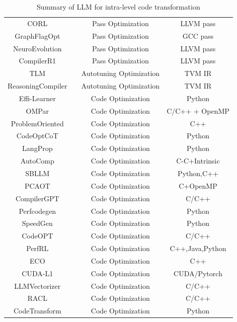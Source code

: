 \documentclass[pdflatex,sn-mathphys-ay,twocolumn, a4paper]{sn-jnl}%
\theoremstyle{thmstyleone}%
\theoremstyle{thmstyletwo}%
\theoremstyle{thmstylethree}%
\begin{document}
\begin{table}
{\begin{tabular}{|c|c|c|c|}
    \hline
    CORL & \citet{40_mammadli2020static_llvmhpc} & Pass Optimization & LLVM pass \\
    GraphFlagOpt & \citet{125_graphbased2024_hpec} & Pass Optimization & GCC pass \\
    NeuroEvolution & \citet{127_neuroevolutionary2023_gecco} & Pass Optimization & LLVM pass \\
    CompilerR1 & \citet{45_compilerr1-2025_arxiv} & Pass Optimization & LLVM pass \\
    TLM & \citet{167_zhai2024_osdi} & Autotuning Optimization & TVM IR \\
    ReasoningCompiler & \citet{4_tang2025compiler_arxiv} & Autotuning Optimization & TVM IR \\
    Effi-Learner & \citet{79_huang2024effilearner} & Code Optimization & Python \\
    OMPar & \citet{93_kadosh2024omparautomaticparallelizationaidriven} & Code Optimization & C/C++ + OpenMP \\
    ProblemOriented & \citet{123_ye2024problem} & Code Optimization & C++ \\
    CodeOptCoT & \citet{116_xu2024code} & Code Optimization & Python \\
    LangProp & \citet{30_ishida2024langprop} & Code Optimization & Python \\
    AutoComp & \citet{6_hong2025autocomp} & Code Optimization & C-C+Intrinsic \\
    SBLLM & \citet{17_gao2025search} & Code Optimization & Python,C++ \\
    PCAOT & \citet{22_romero2025should} & Code Optimization & C+OpenMP \\
    CompilerGPT & \citet{3_compilergpt2025_arxiv} & Code Optimization & C/C++ \\
    Perfcodegen & \citet{52_peng2025perfcodegen} & Code Optimization & Python \\
    SpeedGen & \citet{58_purschke2025speedgen} & Code Optimization & Python \\
    CodeOPT & \citet{63_xu2025efficient} & Code Optimization & C/C++ \\
    PerfRL & \citet{134_duan2025perfrlsmalllanguagemodel} & Code Optimization & C++,Java,Python \\
    ECO & \citet{12_lin2025eco} & Code Optimization & C++ \\
    CUDA-L1 & \citet{cudal1_2025_arxiv} & Code Optimization & CUDA/Pytorch \\
    LLMVectorizer & \citet{47_llmvectorizer2025_cgo} & Code Optimization & C/C++ \\
    RACL & \citet{46_wang2025_pldi} & Code Optimization & C/C++ \\
    CodeTransform & \citet{178_cummins2024donttransformcodecode} & Code Optimization & Python \\
    \hline
    \end{tabular}
    }
    \caption{Summary of LLM for intra-level code transformation}
    \label{tab:intra-level}
\end{table}
\end{document}
